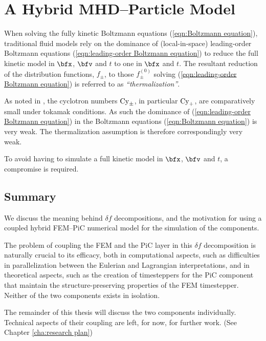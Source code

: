 \chapter{A Hybrid MHD--Particle Model}\label{cha:delta f corrections}
    When solving the fully kinetic Boltzmann equations (\ref{eqn:Boltzmann equation}), traditional fluid models rely on the dominance of (local-in-space) leading-order Boltzmann equations (\ref{eqn:leading-order Boltzmann equation}) to reduce the full kinetic model in $\bfx$, $\bfv$ and $t$ to one in $\bfx$ and $t$. The resultant reduction of the distribution functions, $f_{\pm}$, to those $f_{\pm}^{(0)}$ solving (\ref{eqn:leading-order Boltzmann equation}) is referred to as \emph{``thermalization''}.
    
    As noted in \cite{addendum_I}, the cyclotron numbers $\mathrm{Cy}_{\pm}$, in particular $\mathrm{Cy}_{+}$, are comparatively small under tokamak conditions. As such the dominance of (\ref{eqn:leading-order Boltzmann equation}) in the Boltzmann equations (\ref{eqn:Boltzmann equation}) is very weak. The thermalization assumption is therefore correspondingly very weak.

    To avoid having to simulate a full kinetic model in $\bfx$, $\bfv$ and $t$, a compromise is required.


    
    
    
    


    \section*{Summary}
        We discuss the meaning behind $\delta\!f$ decompositions, and the motivation for using a coupled hybrid FEM--PiC numerical model for the simulation of the components.
        
        The problem of coupling the FEM and the PiC layer in this $\delta\!f$ decomposition is naturally crucial to its efficacy, both in computational aspects, such as difficulties in parallelization between the Eulerian and Lagrangian interpretations, and in theoretical aspects, such as the creation of timesteppers for the PiC component that maintain the structure-preserving properties of the FEM timestepper. Neither of the two components exists in isolation.
        
        The remainder of this thesis will discuss the two components individually. Technical aspects of their coupling are left, for now, for further work. (See Chapter \ref{cha:research plan})
    